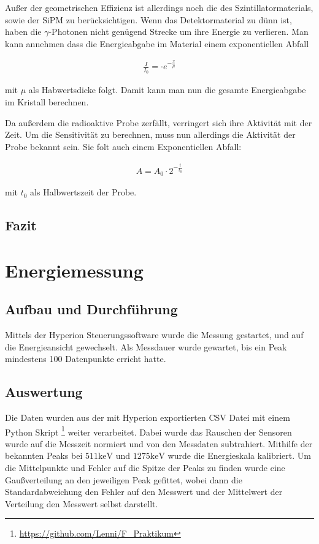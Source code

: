 \documentclass[12pt,twoside,a4paper]{scrartcl}
\begin{document}
			Außer der geometrischen Effizienz ist allerdings noch die des Szintillatormaterials, sowie der SiPM zu berücksichtigen. Wenn das Detektormaterial zu dünn ist, haben die $\gamma$-Photonen nicht genügend Strecke um ihre Energie zu verlieren. Man kann annehmen dass die Energieabgabe im Material einem exponentiellen Abfall

			\begin{align*}
				\frac{I}{I_0} =  \cdot e^{-\frac{x}{\mu}}
			\end{align*}

			mit $\mu$ als Habwertsdicke folgt. Damit kann man nun die gesamte Energieabgabe im Kristall berechnen.

			Da außerdem die radioaktive Probe zerfällt, verringert sich ihre Aktivität mit der Zeit. Um die Sensitivität zu berechnen, muss nun allerdings die Aktivität der Probe bekannt sein. Sie folt auch einem Exponentiellen Abfall:

			\begin{align*}
				A = A_0 \cdot 2^{- \frac{t}{t_0}}
			\end{align*}

			mit $t_0$ als Halbwertszeit der Probe.

		\subsection{Fazit}



	\section{Energiemessung}

	\subsection{Aufbau und Durchführung}
		Mittels der Hyperion Steuerungssoftware wurde die Messung gestartet, und auf die Energieansicht gewechselt. Als Messdauer wurde gewartet, bis ein Peak mindestens 100 Datenpunkte erricht hatte.


	\subsection{Auswertung}

		Die Daten wurden aus der mit Hyperion exportierten CSV Datei mit einem Python Skript \footnote{\url{https://github.com/Lenni/F_Praktikum}} weiter verarbeitet. Dabei wurde das Rauschen der Sensoren wurde auf die Messzeit normiert und von den Messdaten subtrahiert. Mithilfe der bekannten Peaks bei $511 \si{\kilo \electronvolt}$ und $1275 \si{\kilo \electronvolt}$ wurde die Energieskala kalibriert. Um die Mittelpunkte und Fehler auf die Spitze der Peaks zu finden wurde eine Gaußverteilung an den jeweiligen Peak gefittet, wobei dann die Standardabweichung den Fehler auf den Messwert und der Mittelwert der Verteilung den Messwert selbst darstellt.
\end{document}
